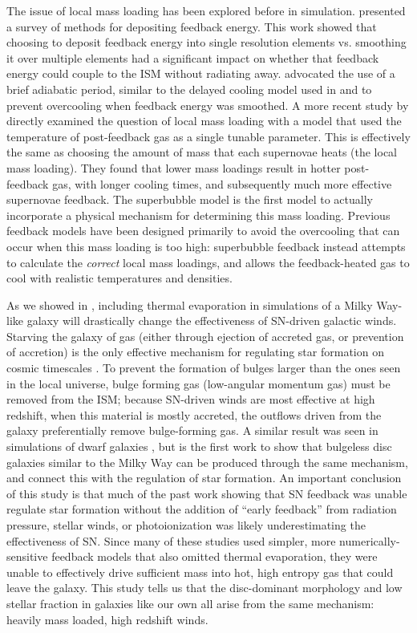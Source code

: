 The issue of local mass loading has been explored before in simulation.
\citet{Thacker2000} presented a survey of methods for depositing feedback
energy.  This work showed that choosing to deposit feedback energy into single
resolution elements vs. smoothing it over multiple elements had a significant
impact on whether that feedback energy could couple to the ISM without radiating
away.  \citet{Thacker2000} advocated the use of a brief adiabatic period,
similar to the delayed cooling model used in \citet{Stinson2006} and
\citet{Rosdahl2016} to prevent overcooling when feedback energy was smoothed.  A
more recent study by \citet{DallaVecchia2012} directly examined the question of
local mass loading with a model that used the temperature of post-feedback
gas as a single tunable parameter.  This is effectively the same as choosing
the amount of mass that each supernovae heats (the local mass loading).
They found that lower mass loadings result in hotter post-feedback gas, with
longer cooling times, and subsequently much more effective supernovae feedback.
The \citet{Keller2014} superbubble model is the first model to actually
incorporate a physical mechanism for determining this mass loading.  Previous
feedback models have been designed primarily to avoid the overcooling that can
occur when this mass loading is too high: superbubble feedback instead attempts
to calculate the {\it correct} local mass loadings, and allows the
feedback-heated gas to cool with realistic temperatures and densities.  

As we showed in \citet{Keller2015}, including thermal evaporation in simulations
of a Milky Way-like galaxy will drastically change the effectiveness of
SN-driven galactic winds.  Starving the galaxy of gas (either through ejection
of accreted gas, or prevention of accretion) is the only effective mechanism for
regulating star formation on cosmic timescales \citet{Keres2009}.  To prevent
the formation of bulges larger than the ones seen in the local universe, bulge
forming gas (low-angular momentum gas) must be removed from the ISM; because
SN-driven winds are most effective at high redshift, when this material is
mostly accreted, the outflows driven from the galaxy preferentially remove
bulge-forming gas.  A similar result was seen in simulations of dwarf galaxies
\citep{Governato2010, Brook2011}, but \citet{Keller2015} is the first work to
show that bulgeless disc galaxies similar to the Milky Way can be
produced through the same mechanism, and connect this with the regulation of
star formation.  An important conclusion of this study is that much of the past
work \citep{Stinson2013,Agertz2013,Hopkins2014} showing that SN feedback was
unable regulate star formation without the addition of ``early feedback'' from
radiation pressure, stellar winds, or photoionization was likely underestimating
the effectiveness of SN.  Since many of these studies used simpler, more
numerically-sensitive feedback models that also omitted thermal evaporation,
they were unable to effectively drive sufficient mass into hot, high entropy gas
that could leave the galaxy.  This study tells us that the disc-dominant
morphology and low stellar fraction in galaxies like our own all arise from the
same mechanism:  heavily mass loaded, high redshift winds.

